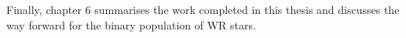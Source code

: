 Finally, chapter 6 summarises the work completed in this thesis and discusses the way forward for the binary population of WR stars. 
 


















\cleardoublepage
